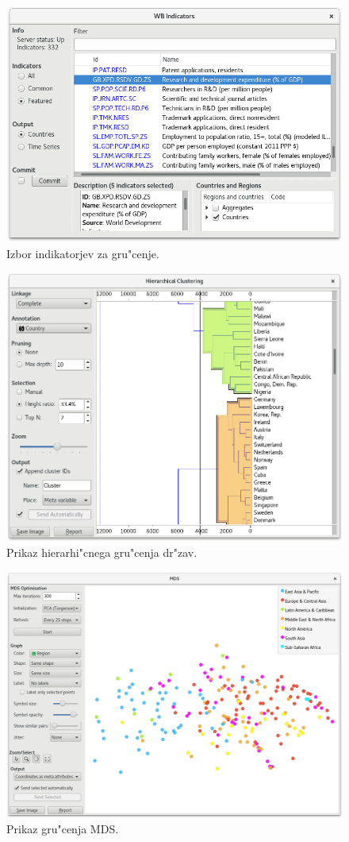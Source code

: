 \begin{figure}
\begin{center}
\includegraphics[width=12cm]{pic/clustering_indicator_selection.png}
\end{center}
\caption{Izbor indikatorjev za gru"cenje.}
\label{}
\end{figure} 

\begin{figure}
\begin{center}
\includegraphics[width=12cm]{pic/clustering_hierarchial_countries.png}
\end{center}
\caption{Prikaz hierarhi"cnega gru"cenja dr"zav.}
\label{clustering_hierarchial_countries}
\end{figure} 

\begin{figure}
\begin{center}
\includegraphics[width=12cm]{pic/clustering_mds.png}
\end{center}
\caption{Prikaz gru"cenja MDS.}
\label{clustering_mds}
\end{figure} 

